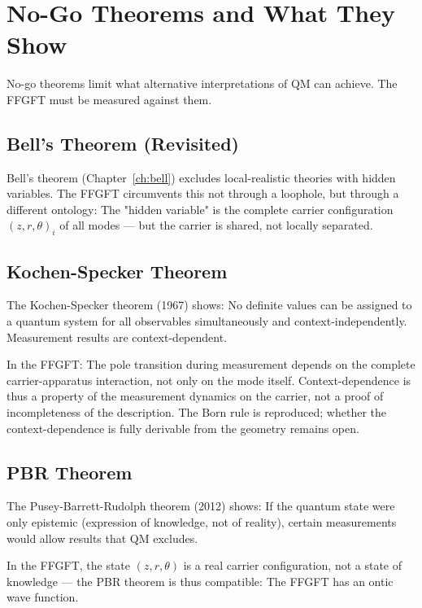 \chapter{No-Go Theorems and What They Show}
\label{ch:nogo}

No-go theorems limit what alternative interpretations of QM
can achieve. The FFGFT must be measured against them.

\section{Bell's Theorem (Revisited)}

Bell's theorem (Chapter~\ref{ch:bell}) excludes local-realistic
theories with hidden variables. The FFGFT circumvents this
not through a loophole, but through a different ontology: The
"hidden variable" is the complete carrier configuration
$(z,r,\theta)_i$ of all modes — but the carrier is shared, not
locally separated.

\section{Kochen-Specker Theorem}

The Kochen-Specker theorem (1967) shows: No definite values can be assigned to a quantum system for all observables simultaneously and
context-independently. Measurement results are
context-dependent.

In the FFGFT: The pole transition during measurement depends on the
complete carrier-apparatus interaction, not only on
the mode itself. Context-dependence is thus a property
of the measurement dynamics on the carrier, not a proof of incompleteness
of the description. The Born rule is reproduced;
whether the context-dependence is fully derivable from the geometry
remains open.

\section{PBR Theorem}

The Pusey-Barrett-Rudolph theorem (2012) shows: If the quantum
state were only epistemic (expression of knowledge, not of
reality), certain measurements would allow results that
QM excludes.

In the FFGFT, the state $(z,r,\theta)$ is a real carrier
configuration, not a state of knowledge — the PBR theorem is thus
compatible: The FFGFT has an ontic wave function.

